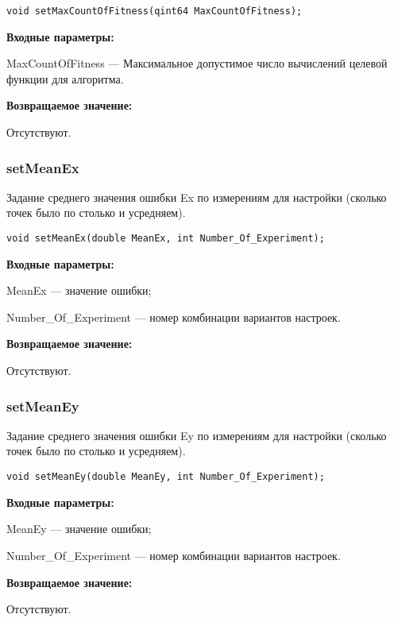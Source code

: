 \documentclass[a4paper,12pt]{article}
\begin{document}
\begin{lstlisting}[label=code_syntax_setMaxCountOfFitness,caption=Синтаксис]
void setMaxCountOfFitness(qint64 MaxCountOfFitness);
\end{lstlisting}

\textbf{Входные параметры:}

MaxCountOfFitness --- Максимальное допустимое число вычислений целевой функции для алгоритма.

\textbf{Возвращаемое значение:}

Отсутствуют.


\subsubsection{setMeanEx}\label{setMeanEx}

Задание среднего значения ошибки Ex по измерениям для настройки (сколько точек было по столько и усредняем).


\begin{lstlisting}[label=code_syntax_setMeanEx,caption=Синтаксис]
void setMeanEx(double MeanEx, int Number_Of_Experiment);
\end{lstlisting}

\textbf{Входные параметры:}

MeanEx --- значение ошибки;

Number\_Of\_Experiment --- номер комбинации вариантов настроек.

\textbf{Возвращаемое значение:}

Отсутствуют.


\subsubsection{setMeanEy}\label{setMeanEy}

Задание среднего значения ошибки Ey по измерениям для настройки (сколько точек было по столько и усредняем).


\begin{lstlisting}[label=code_syntax_setMeanEy,caption=Синтаксис]
void setMeanEy(double MeanEy, int Number_Of_Experiment);
\end{lstlisting}

\textbf{Входные параметры:}

MeanEy --- значение ошибки;

Number\_Of\_Experiment --- номер комбинации вариантов настроек.

\textbf{Возвращаемое значение:}

Отсутствуют.
\end{document}
